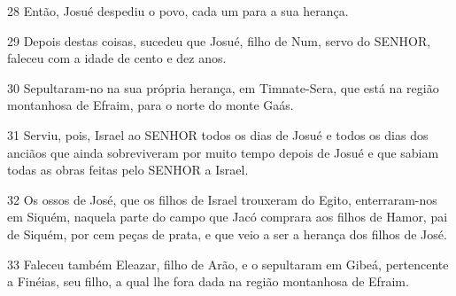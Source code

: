 \par 28 Então, Josué despediu o povo, cada um para a sua herança.
\par 29 Depois destas coisas, sucedeu que Josué, filho de Num, servo do SENHOR, faleceu com a idade de cento e dez anos.
\par 30 Sepultaram-no na sua própria herança, em Timnate-Sera, que está na região montanhosa de Efraim, para o norte do monte Gaás.
\par 31 Serviu, pois, Israel ao SENHOR todos os dias de Josué e todos os dias dos anciãos que ainda sobreviveram por muito tempo depois de Josué e que sabiam todas as obras feitas pelo SENHOR a Israel.
\par 32 Os ossos de José, que os filhos de Israel trouxeram do Egito, enterraram-nos em Siquém, naquela parte do campo que Jacó comprara aos filhos de Hamor, pai de Siquém, por cem peças de prata, e que veio a ser a herança dos filhos de José.
\par 33 Faleceu também Eleazar, filho de Arão, e o sepultaram em Gibeá, pertencente a Finéias, seu filho, a qual lhe fora dada na região montanhosa de Efraim.


